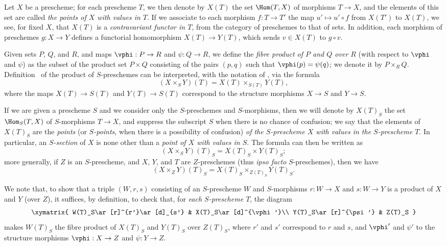 \begin{env}[3.4.1]
\label{I.3.4.1}
Let $X$ be a prescheme; for each prescheme $T$, we then denote by $X(T)$ the set
$\Hom(T,X)$ of morphisms $T\to X$, and the elements of this set are called
\emph{the points of $X$ with values in $T$}. If we associate to each morphism
$f:T\to T'$ the map $u'\mapsto u'\circ f$ from $X(T')$ to $X(T)$, we see,
for fixed $X$, that $X(T)$ is a \emph{contravariant functor in $T$}, from the
category of preschemes to that of sets. In addition, each morphism of preschemes
$g:X\to Y$ defines a functorial homomorphism $X(T)\to Y(T)$, which sends
$v\in X(T)$ to $g\circ v$.
\end{env}

\begin{env}[3.4.2]
\label{I.3.4.2}
Given sets $P$, $Q$, and $R$, and maps $\vphi:P\to R$ and $\psi:Q\to R$, we define the
\emph{fibre product of $P$ and $Q$ over $R$} (with respect to $\vphi$ and $\psi$) as the subset
of
the product set $P\times Q$ consisting of the pairs $(p,q)$ such that $\vphi(p)=\psi(q)$; we
denote it by $P\times_R Q$. Definition~ of the product
of $S$-preschemes can be interpreted, with the notation of ,
via the formula
\[
\label{I.3.4.2.1}
  (X\times_S Y)(T)=X(T)\times_{S(T)}Y(T),
  \tag{3.4.2.1}
\]
where the maps $X(T)\to S(T)$ and $Y(T)\to S(T)$ correspond to the structure morphisms
$X\to S$ and $Y\to S$.
\end{env}

\begin{env}[3.4.3]
\label{I.3.4.3}
If we are given a prescheme $S$ and we consider only the $S$-preschemes and $S$-morphisms,
then we will denote by $X(T)_S$ the set $\Hom_S(T,X)$ of $S$-morphisms $T\to X$, and suppress
the subscript $S$ when there is no chance of confusion; we say that the elements of $X(T)_S$
are the \emph{points} (or \emph{$S$-points}, when there is a possibility of confusion)
\emph{of the $S$-prescheme $X$ with values in the $S$-prescheme $T$}. In particular, an
\emph{$S$-section} of $X$ is none other than a \emph{point of $X$ with values in $S$}. The
formula  can then be written as
\[
\label{I.3.4.3.1}
  (X\times_S Y)(T)_S=X(T)_S\times Y(T)_S;
  \tag{3.4.3.1}
\]
more generally, if $Z$ is an $S$-prescheme, and $X$, $Y$, and $T$ are $Z$-preschemes (thus
\emph{ipso facto} $S$-preschemes), then we have
\[
\label{I.3.4.3.2}
  (X\times_Z Y)(T)_S=X(T)_S\times_{Z(T)_S}Y(T)_S.
  \tag{3.4.3.2}
\]

We note that, to show that a triple $(W,r,s)$ consisting of an $S$-prescheme $W$ and
$S$-morphisms $r:W\to X$ and $s:W\to Y$ is a product of $X$ and $Y$ (over $Z$), it suffices, by
definition, to check that, for \emph{each $S$-prescheme $T$}, the diagram
\[
  \xymatrix{
    W(T)_S\ar[r]^{r'}\ar[d]_{s'} &
    X(T)_S\ar[d]^{\vphi'}\\
    Y(T)_S\ar[r]^{\psi'} &
    Z(T)_S
  }
\]
makes $W(T)_S$ the fibre product of $X(T)_S$ and $Y(T)_S$ over $Z(T)_S$, where $r'$ and $s'$
correspond to $r$ and $s$, and $\vphi'$ and $\psi'$ to the structure morphisms $\vphi:X\to Z$ and $\psi:Y\to Z$.
\end{env}

